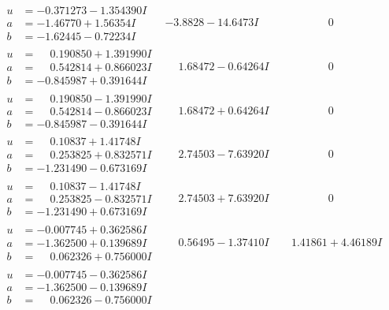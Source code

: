 \documentclass[1p]{elsarticle_modified}
\theoremstyle{definition}
\begin{document}
$$\begin{array}{c|c|c}
\begin{aligned}
u &= -0.371273 - 1.354390 I \\
a &= -1.46770 + 1.56354 I \\
b &= -1.62445 - 0.72234 I\end{aligned}
 & -3.8828 - 14.6473 I & \phantom{-0.000000 } 0 \\ \hline\begin{aligned}
u &= \phantom{-}0.190850 + 1.391990 I \\
a &= \phantom{-}0.542814 + 0.866023 I \\
b &= -0.845987 + 0.391644 I\end{aligned}
 & \phantom{-}1.68472 - 0.64264 I & \phantom{-0.000000 } 0 \\ \hline\begin{aligned}
u &= \phantom{-}0.190850 - 1.391990 I \\
a &= \phantom{-}0.542814 - 0.866023 I \\
b &= -0.845987 - 0.391644 I\end{aligned}
 & \phantom{-}1.68472 + 0.64264 I & \phantom{-0.000000 } 0 \\ \hline\begin{aligned}
u &= \phantom{-}0.10837 + 1.41748 I \\
a &= \phantom{-}0.253825 + 0.832571 I \\
b &= -1.231490 - 0.673169 I\end{aligned}
 & \phantom{-}2.74503 - 7.63920 I & \phantom{-0.000000 } 0 \\ \hline\begin{aligned}
u &= \phantom{-}0.10837 - 1.41748 I \\
a &= \phantom{-}0.253825 - 0.832571 I \\
b &= -1.231490 + 0.673169 I\end{aligned}
 & \phantom{-}2.74503 + 7.63920 I & \phantom{-0.000000 } 0 \\ \hline\begin{aligned}
u &= -0.007745 + 0.362586 I \\
a &= -1.362500 + 0.139689 I \\
b &= \phantom{-}0.062326 + 0.756000 I\end{aligned}
 & \phantom{-}0.56495 - 1.37410 I & \phantom{-}1.41861 + 4.46189 I \\ \hline\begin{aligned}
u &= -0.007745 - 0.362586 I \\
a &= -1.362500 - 0.139689 I \\
b &= \phantom{-}0.062326 - 0.756000 I\end{aligned}

\end{array}$$
\end{document}
